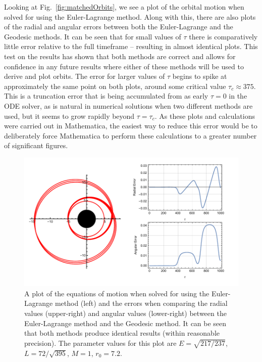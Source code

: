 Looking at Fig.~\eqref{fig:matchedOrbits}, we see a plot of the orbital motion when solved for using the Euler-Lagrange method.
Along with this, there are also plots of the radial and angular errors between both the Euler-Lagrange and the Geodesic methods.
It can be seen that for small values of $\tau$ there is comparatively little error relative to the full timeframe -- resulting in almost identical plots.
This test on the results has shown that both methods are correct and allows for confidence in any future results where either of these methods will be used to derive and plot orbits.
The error for larger values of $\tau$ begins to spike at approximately the same point on both plots, around some critical value $\tau_c\approx 375$.
This is a truncation error that is being accumulated from as early $\tau=0$ in the ODE solver, as is natural in numerical solutions when two different methods are used, but it seems to grow rapidly beyond $\tau=\tau_c$.
As these plots and calculations were carried out in Mathematica, the easiest way to reduce this error would be to deliberately force Mathematica to perform these calculations to a greater number of significant figures.

\begin{figure}[!ht]
    \centering
    \includegraphics[width=\textwidth]{images/MatchedOrbits.pdf}
    \caption[Results of matched Euler-Lagrange and Geodesic orbits]{A plot of the equations of motion when solved for using the Euler-Lagrange method (left) and the errors when comparing the radial values (upper-right) and angular values (lower-right) between the Euler-Lagrange method and the Geodesic method. It can be seen that both methods produce identical results (within reasonable precision). The parameter values for this plot are $E=\sqrt{217/237}$, $L=72/\sqrt{395}$, $M=1$, $r_0=7.2$.}
    \label{fig:matchedOrbits}
\end{figure}

